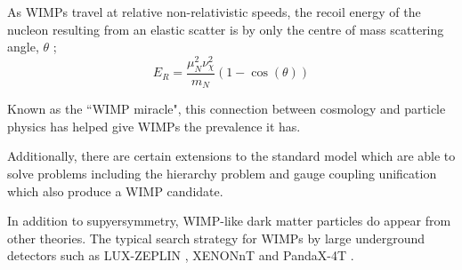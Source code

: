As WIMPs travel at relative non-relativistic speeds, the recoil energy of the nucleon resulting from an elastic scatter is by only the centre of mass scattering angle, $\theta$ \cite{direct_detection_of_wimps_ref};
\begin{equation}
    E_{R} = \frac{{\mu}_{N}^{2}\nu_{\chi}^2}{m_{N}}(1-\cos(\theta))
\end{equation}


\par
Known as the ``WIMP miracle", this connection between cosmology and particle physics has helped give WIMPs the prevalence it has.


\par
Additionally, there are certain extensions to the standard model which are able to solve problems including the hierarchy problem and gauge coupling unification which also produce a WIMP candidate.


\par
In addition to supyersymmetry, WIMP-like dark matter particles do appear from other theories.
The typical search strategy for WIMPs by large underground detectors such as LUX-ZEPLIN \cite{LZ_TechnicalDesignReview_ref}, XENONnT \cite{xenonnt_projected_sensitivty_ref} and PandaX-4T \cite{pandax_4t_ref}.